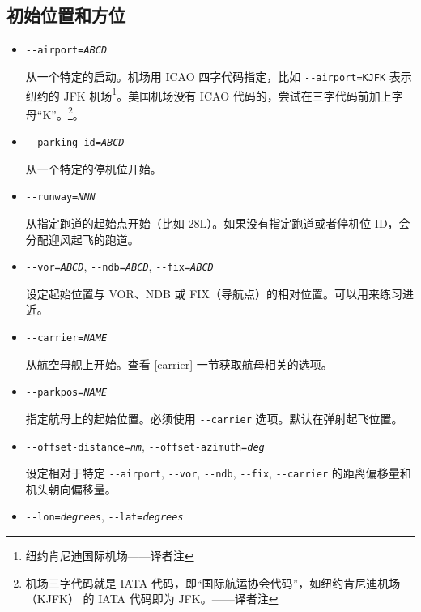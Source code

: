 \ifchinese
{
  \subsection{初始位置和方位\label{aiportid}}
\begin{itemize}
\item{\texttt{-$ $-airport={\it ABCD}}}

 从一个特定的启动。机场用 ICAO 四字代码指定，比如 \texttt{-$ $-airport=KJFK} 表示纽约的 JFK 机场\footnote{纽约肯尼迪国际机场——译者注}。美国机场没有 ICAO 代码的，尝试在三字代码前加上字母“K”。\footnote{机场三字代码就是 IATA 代码，即“国际航运协会代码”，如纽约肯尼迪机场（KJFK） 的 IATA 代码即为 JFK。——译者注}。

\item{\texttt{-$ $-parking-id={\it ABCD}}}

从一个特定的停机位开始。

\item{\texttt{-$ $-runway={\it NNN}}}

从指定跑道的起始点开始（比如 28L）。如果没有指定跑道或者停机位 ID，会分配迎风起飞的跑道。

 \item{\texttt{-$ $-vor={\it ABCD}}, \texttt{-$ $-ndb={\it ABCD}}, \texttt{-$ $-fix={\it ABCD}}}

设定起始位置与 VOR、NDB 或 FIX（导航点）的相对位置。可以用来练习进近。

\item{\texttt{-$ $-carrier={\it NAME}}}

从航空母舰上开始。查看 \ref{carrier} 一节获取航母相关的选项。

\item{\texttt{-$ $-parkpos={\it NAME}}}

指定航母上的起始位置。必须使用 \texttt{-$ $-carrier} 选项。默认在弹射起飞位置。

\item{\texttt{-$ $-offset-distance={\it nm}}, \texttt{-$ $-offset-azimuth={\it deg}}}

设定相对于特定 \texttt{-$ $-airport}, \texttt{-$ $-vor}, \texttt{-$ $-ndb}, \texttt{-$ $-fix}, \texttt{-$ $-carrier} 的距离偏移量和机头朝向偏移量。

 \item{\texttt{-$ $-lon={\it degrees}}, \texttt{-$ $-lat={\it degrees}}}


\end{itemize}}
